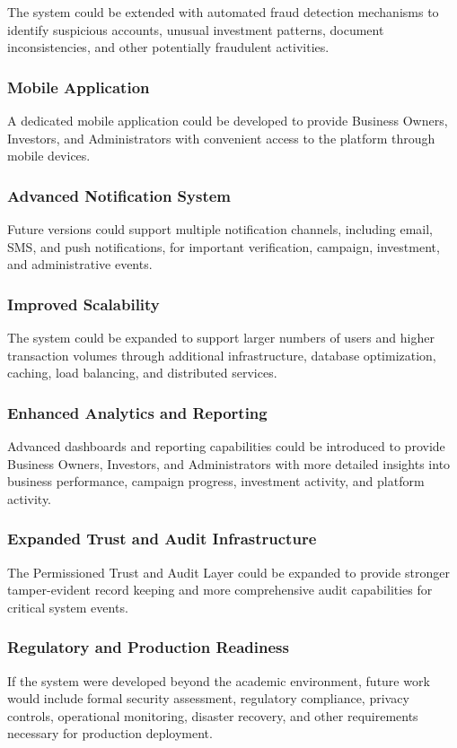 The system could be extended with automated fraud detection mechanisms
to identify suspicious accounts, unusual investment patterns, document
inconsistencies, and other potentially fraudulent activities.

\subsubsection{Mobile Application}

A dedicated mobile application could be developed to provide Business
Owners, Investors, and Administrators with convenient access to the
platform through mobile devices.

\subsubsection{Advanced Notification System}

Future versions could support multiple notification channels, including
email, SMS, and push notifications, for important verification,
campaign, investment, and administrative events.

\subsubsection{Improved Scalability}

The system could be expanded to support larger numbers of users and
higher transaction volumes through additional infrastructure,
database optimization, caching, load balancing, and distributed
services.

\subsubsection{Enhanced Analytics and Reporting}

Advanced dashboards and reporting capabilities could be introduced to
provide Business Owners, Investors, and Administrators with more
detailed insights into business performance, campaign progress,
investment activity, and platform activity.

\subsubsection{Expanded Trust and Audit Infrastructure}

The Permissioned Trust and Audit Layer could be expanded to provide
stronger tamper-evident record keeping and more comprehensive audit
capabilities for critical system events.

\subsubsection{Regulatory and Production Readiness}

If the system were developed beyond the academic environment, future
work would include formal security assessment, regulatory compliance,
privacy controls, operational monitoring, disaster recovery, and other
requirements necessary for production deployment.